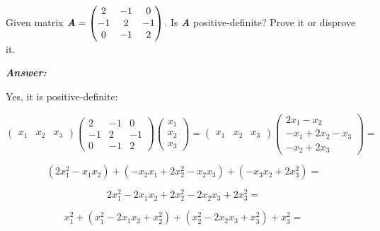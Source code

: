 \documentclass[12pt]{article}
\newcommand{\blditA}{\textbf{\textit{A}}}
\newenvironment{question}[2][Question]{\begin{trivlist}
\item[\hskip \labelsep {\bfseries #1}\hskip \labelsep {\bfseries #2.}]}{\end{trivlist}}
\begin{document}
\bigskip
\bigskip
\begin{question}{1. 4} 
Given matrix $\blditA =  \begin{pmatrix}
  2 & -1 & 0\\
  -1 & 2 & -1\\
  0 & -1 & 2
\end{pmatrix} $. Is \blditA $ $ positive-definite? Prove it or disprove it.
\end{question}

\textbf{\emph{Answer:} }

Yes, it is positive-definite:


\begin{equation*}
\begin{pmatrix}
x_1 & x_2 & x_3
\end{pmatrix} 
\begin{pmatrix}
  2 & -1 & 0\\
  -1 & 2 & -1\\
  0 & -1 & 2
\end{pmatrix} 
\begin{pmatrix}
x_1 \\ 
x_2 \\
 x_3
\end{pmatrix} 
=  
\begin{pmatrix}
x_1 & x_2 & x_3
\end{pmatrix} 
\begin{pmatrix}
2 x_1 - x_2\\ 
-x_1 + 2 x_2 - x_3\\
 -x_2 + 2 x_3
\end{pmatrix}  = 
\end{equation*}

\begin{equation*}
(2 x_1^2 - x_1 x_2) + (- x_2 x_1 +2 x_2^2 - x_2 x_3) + (-x_3 x_2 + 2 x_3^2) = 
\end{equation*}

\begin{equation*}
2 x_1^2 - 2 x_1 x_2 + 2 x_2^2 - 2 x_2 x_3 + 2 x_3^2 = 
\end{equation*}

\begin{equation*}
x_1^2 + (x_1^2 - 2 x_1 x_2 + x_2^2) + (x_2^2 - 2 x_2 x_3 + x_3^2) + x_3^2= 
\end{equation*}
\end{document}
